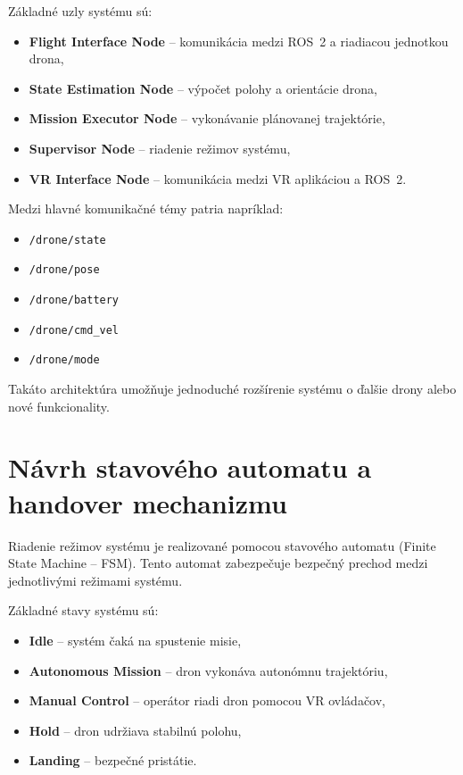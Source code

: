 \documentclass[a4paper,12pt]{article}
\begin{document}
Základné uzly systému sú:

\begin{itemize}
\item \textbf{Flight Interface Node} – komunikácia medzi ROS~2 a riadiacou jednotkou drona,
\item \textbf{State Estimation Node} – výpočet polohy a orientácie drona,
\item \textbf{Mission Executor Node} – vykonávanie plánovanej trajektórie,
\item \textbf{Supervisor Node} – riadenie režimov systému,
\item \textbf{VR Interface Node} – komunikácia medzi VR aplikáciou a ROS~2.
\end{itemize}

Medzi hlavné komunikačné témy patria napríklad:

\begin{itemize}
\item \texttt{/drone/state}
\item \texttt{/drone/pose}
\item \texttt{/drone/battery}
\item \texttt{/drone/cmd\_vel}
\item \texttt{/drone/mode}
\end{itemize}

Takáto architektúra umožňuje jednoduché rozšírenie systému o ďalšie drony alebo nové funkcionality.

\section{Návrh stavového automatu a handover mechanizmu}

Riadenie režimov systému je realizované pomocou stavového automatu (Finite State Machine – FSM). 
Tento automat zabezpečuje bezpečný prechod medzi jednotlivými režimami systému.

Základné stavy systému sú:

\begin{itemize}
\item \textbf{Idle} – systém čaká na spustenie misie,
\item \textbf{Autonomous Mission} – dron vykonáva autonómnu trajektóriu,
\item \textbf{Manual Control} – operátor riadi dron pomocou VR ovládačov,
\item \textbf{Hold} – dron udržiava stabilnú polohu,
\item \textbf{Landing} – bezpečné pristátie.
\end{itemize}
\end{document}
